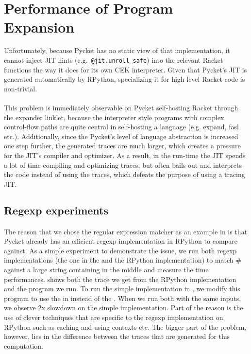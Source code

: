 	\section{Performance of Program Expansion}
	\label{section:expander-performance}



		 Unfortunately, because Pycket has no static view of that implementation, it cannot inject JIT hints (e.g.\ \verb|@jit.unroll_safe|) into the relevant Racket functions the way it does for its own CEK interpreter.  Given that Pycket’s JIT is generated automatically by RPython, specializing it for high-level Racket code is non-trivial.

		\paragraph{}%
			This problem is immediately observable on Pycket self-hosting Racket
		through the expander linklet, because the interpreter style programs
		with complex control-flow paths are quite central in self-hosting a
		language (e.g. expand, fasl etc.). Additionally, since the Pycket's
		level of language abstraction is increased one step further, the
		generated traces are much larger, which creates a pressure for the
		JIT's compiler and optimizer. As a result, in the run-time the JIT
		spends a lot of time compiling and optimizing traces, but often bails
		out and interprets the code instead of using the traces, which defeats
		the purpose of using a tracing JIT.



		\subsection{Regexp experiments}

			\paragraph{}%
			The reason that we chose the regular expression matcher as an example
			in  is that Pycket already has an efficient regexp
			implementation in RPython to compare against. As a simple experiment
			to demonstrate the issue, we run both regexp implementations (the one
			in the  and the RPython implementation) to match
			$\mathtt{\#}$ against a large string containing
			 in the middle and measure the time
			performances.  shows both the trace we get
			from the RPython implementation and the program we run. To run the
			simple implementation in , we modify this program
			to use the  in instead of the
			. When we run both with the same inputs, we
			observe 2x slowdown on the simple implementation. Part of the reason
			is the use of clever techniques that are specific to the regexp
			implementation on RPython such as caching and using contexts etc. The
			bigger part of the problem, however, lies in the difference between
			the traces that are generated for this computation.

